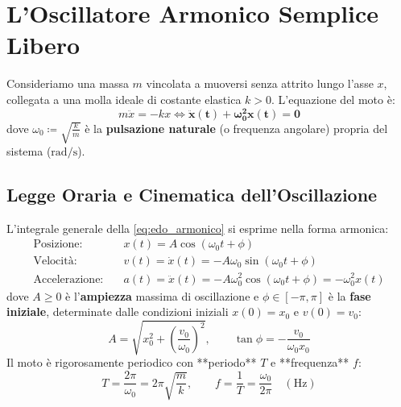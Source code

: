 \section{L'Oscillatore Armonico Semplice Libero}
\label{sec:oscillatore_armonico_semplice}

Consideriamo una massa $m$ vincolata a muoversi senza attrito lungo l'asse $x$, collegata a una molla ideale di costante elastica $k > 0$. L'equazione del moto è:
\begin{equation}
    m\ddot{x} = -kx \iff \mathbf{\ddot{x}(t) + \omega_0^2 x(t) = 0}
    \label{eq:edo_armonico}
\end{equation}
dove $\omega_0 \coloneqq \sqrt{\frac{k}{m}}$ è la \textbf{pulsazione naturale} (o frequenza angolare) propria del sistema ($\si{\radian\per\second}$).

\subsection{Legge Oraria e Cinematica dell'Oscillazione}
L'integrale generale della \eqref{eq:edo_armonico} si esprime nella forma armonica:
\begin{align}
    \text{Posizione:} \quad & x(t) = A \cos(\omega_0 t + \phi) \label{eq:x_armonico} \\
    \text{Velocità:} \quad & v(t) = \dot{x}(t) = -A\omega_0 \sin(\omega_0 t + \phi) \label{eq:v_armonico} \\
    \text{Accelerazione:} \quad & a(t) = \ddot{x}(t) = -A\omega_0^2 \cos(\omega_0 t + \phi) = -\omega_0^2 x(t) \label{eq:a_armonico}
\end{align}
dove $A \ge 0$ è l'\textbf{ampiezza} massima di oscillazione e $\phi \in [-\pi, \pi]$ è la \textbf{fase iniziale}, determinate dalle condizioni iniziali $x(0) = x_0$ e $v(0) = v_0$:
\begin{equation}
    A = \sqrt{x_0^2 + \left(\frac{v_0}{\omega_0}\right)^2}, \qquad \tan\phi = -\frac{v_0}{\omega_0 x_0}
\end{equation}
Il moto è rigorosamente periodico con **periodo** $T$ e **frequenza** $f$:
\begin{equation}
    T = \frac{2\pi}{\omega_0} = 2\pi\sqrt{\frac{m}{k}}, \qquad f = \frac{1}{T} = \frac{\omega_0}{2\pi} \quad (\si{\hertz})
\end{equation}

